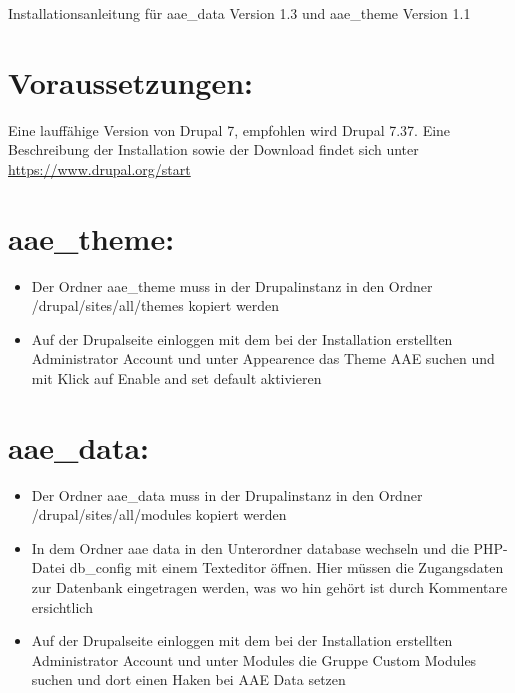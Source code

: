 \documentclass{swp}
\begin{document}
\\\\\\\\\\
Installationsanleitung f\"ur \glqq aae\_{}data\grqq{} Version 1.3 und \glqq aae\_{}theme\grqq{} Version 1.1
\section{Voraussetzungen:}
Eine lauff\"ahige Version von Drupal 7, empfohlen wird Drupal 7.37. Eine Beschreibung der Installation sowie der Download findet sich unter \url{https://www.drupal.org/start}
\section{aae\_{}theme:}
\begin{itemize} 
\item Der Ordner \glqq aae\_{}theme\grqq{} muss in der Drupalinstanz in den Ordner \glqq /drupal/sites/all/themes\grqq{} kopiert werden
\item Auf der Drupalseite einloggen mit dem bei der Installation erstellten Administrator Account und unter \glqq Appearence\grqq{} das Theme \glqq AAE\grqq{} suchen und mit Klick auf \glqq Enable and set default\grqq{} aktivieren
\end{itemize}
\section{aae\_{}data:}
\begin{itemize} 
\item Der Ordner \glqq aae\_{}data\grqq{} muss in der Drupalinstanz in den Ordner \glqq /drupal/sites/all/modules\grqq{} kopiert werden
\item In dem Ordner \glqq aae data\grqq{} in den Unterordner \glqq database\grqq{} wechseln und die PHP-Datei \glqq db\_{}config\grqq{} mit einem Texteditor \"offnen. Hier m\"ussen die Zugangsdaten zur Datenbank eingetragen werden, was wo hin geh\"ort ist durch Kommentare ersichtlich
\item Auf der Drupalseite einloggen mit dem bei der Installation erstellten Administrator Account und unter \glqq Modules\grqq{} die Gruppe \glqq Custom Modules\grqq{} suchen und dort einen Haken bei \glqq AAE Data\grqq{} setzen
\end{itemize}
\end{document}
